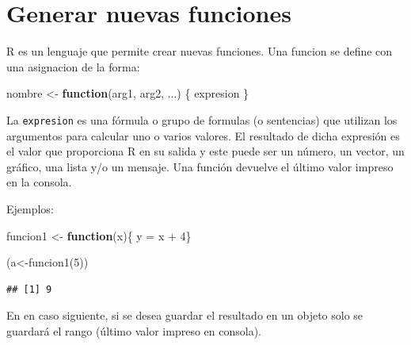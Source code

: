 \documentclass[
]{book}
\newenvironment{Shaded}{\begin{snugshade}}{\end{snugshade}}
\newcommand{\ControlFlowTok}[1]{\textcolor[rgb]{0.13,0.29,0.53}{\textbf{#1}}}
\newcommand{\DecValTok}[1]{\textcolor[rgb]{0.00,0.00,0.81}{#1}}
\newcommand{\FunctionTok}[1]{\textcolor[rgb]{0.00,0.00,0.00}{#1}}
\newcommand{\NormalTok}[1]{#1}
\newcommand{\OtherTok}[1]{\textcolor[rgb]{0.56,0.35,0.01}{#1}}
\newcommand{\SpecialCharTok}[1]{\textcolor[rgb]{0.00,0.00,0.00}{#1}}
\begin{document}
\hypertarget{generar-nuevas-funciones}{%
\chapter{Generar nuevas funciones}\label{generar-nuevas-funciones}}

R es un lenguaje que permite crear nuevas funciones. Una funcion se define con una asignacion de la forma:

\begin{Shaded}
\begin{Highlighting}[]
\NormalTok{nombre }\OtherTok{\textless{}{-}} \ControlFlowTok{function}\NormalTok{(arg1, arg2, ...) \{}
\NormalTok{   expresion}
\NormalTok{ \}}
\end{Highlighting}
\end{Shaded}

La \texttt{expresion} es una fórmula o grupo de formulas (o sentencias) que utilizan los argumentos para calcular uno o varios valores. El resultado de dicha expresión es el valor que proporciona R en su salida y este puede ser un número, un vector, un gráfico, una lista y/o un mensaje. Una función devuelve el último valor impreso en la consola.

Ejemplos:

\begin{Shaded}
\begin{Highlighting}[]
\NormalTok{funcion1 }\OtherTok{\textless{}{-}} \ControlFlowTok{function}\NormalTok{(x)\{ y }\OtherTok{=}\NormalTok{ x }\SpecialCharTok{+} \DecValTok{4}\NormalTok{\}}

\NormalTok{(a}\OtherTok{\textless{}{-}}\FunctionTok{funcion1}\NormalTok{(}\DecValTok{5}\NormalTok{))}
\end{Highlighting}
\end{Shaded}

\begin{verbatim}
## [1] 9
\end{verbatim}

En en caso siguiente, si se desea guardar el resultado en un objeto solo se guardará el rango (último valor impreso en consola).
\end{document}

